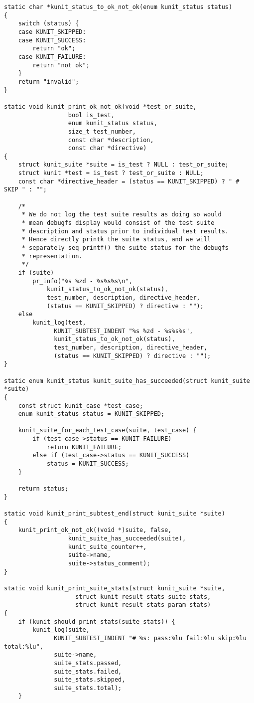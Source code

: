 \documentclass{article}
\begin{document}
\begin{lstlisting}[style=CStyle]
static char *kunit_status_to_ok_not_ok(enum kunit_status status)
{
	switch (status) {
	case KUNIT_SKIPPED:
	case KUNIT_SUCCESS:
		return "ok";
	case KUNIT_FAILURE:
		return "not ok";
	}
	return "invalid";
}

static void kunit_print_ok_not_ok(void *test_or_suite,
				  bool is_test,
				  enum kunit_status status,
				  size_t test_number,
				  const char *description,
				  const char *directive)
{
	struct kunit_suite *suite = is_test ? NULL : test_or_suite;
	struct kunit *test = is_test ? test_or_suite : NULL;
	const char *directive_header = (status == KUNIT_SKIPPED) ? " # SKIP " : "";

	/*
	 * We do not log the test suite results as doing so would
	 * mean debugfs display would consist of the test suite
	 * description and status prior to individual test results.
	 * Hence directly printk the suite status, and we will
	 * separately seq_printf() the suite status for the debugfs
	 * representation.
	 */
	if (suite)
		pr_info("%s %zd - %s%s%s\n",
			kunit_status_to_ok_not_ok(status),
			test_number, description, directive_header,
			(status == KUNIT_SKIPPED) ? directive : "");
	else
		kunit_log(test,
			  KUNIT_SUBTEST_INDENT "%s %zd - %s%s%s",
			  kunit_status_to_ok_not_ok(status),
			  test_number, description, directive_header,
			  (status == KUNIT_SKIPPED) ? directive : "");
}

static enum kunit_status kunit_suite_has_succeeded(struct kunit_suite *suite)
{
	const struct kunit_case *test_case;
	enum kunit_status status = KUNIT_SKIPPED;

	kunit_suite_for_each_test_case(suite, test_case) {
		if (test_case->status == KUNIT_FAILURE)
			return KUNIT_FAILURE;
		else if (test_case->status == KUNIT_SUCCESS)
			status = KUNIT_SUCCESS;
	}

	return status;
}

static void kunit_print_subtest_end(struct kunit_suite *suite)
{
	kunit_print_ok_not_ok((void *)suite, false,
			      kunit_suite_has_succeeded(suite),
			      kunit_suite_counter++,
			      suite->name,
			      suite->status_comment);
}

static void kunit_print_suite_stats(struct kunit_suite *suite,
				    struct kunit_result_stats suite_stats,
				    struct kunit_result_stats param_stats)
{
	if (kunit_should_print_stats(suite_stats)) {
		kunit_log(suite,
			  KUNIT_SUBTEST_INDENT "# %s: pass:%lu fail:%lu skip:%lu total:%lu",
			  suite->name,
			  suite_stats.passed,
			  suite_stats.failed,
			  suite_stats.skipped,
			  suite_stats.total);
	}


\end{lstlisting}
\end{document}
